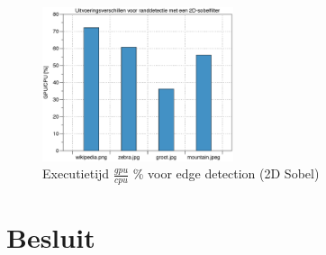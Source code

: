 \documentclass[10pt, twocolumn, a4paper]{article}
\begin{document}
\begin{figure}[H]
    \centering
    \includegraphics[width=0.5\textwidth]{edge_detection.eps}
    \caption{Executietijd $\frac{gpu}{cpu}$ \% voor edge detection (2D Sobel)}
    \label{blocksize}
\end{figure}

\section{Besluit}

\onecolumn

\appendix
\inputminted[tabsize=4,obeytabs]{c}{labo2.c}
\newpage
\inputminted[tabsize=4,obeytabs]{c}{labo2_gray.c}

\end{document}
